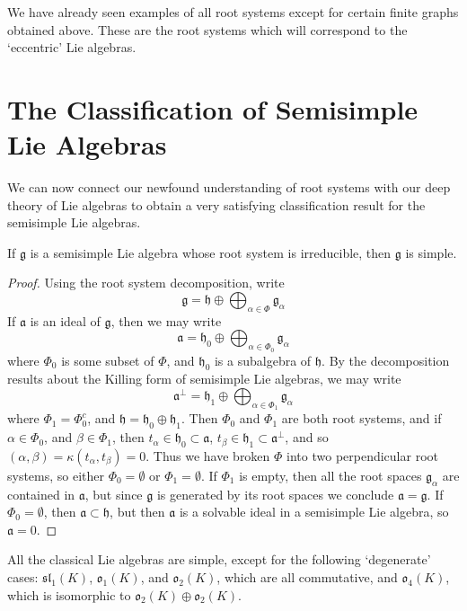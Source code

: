 We have already seen examples of all root systems except for certain finite graphs obtained above. These are the root systems which will correspond to the `eccentric' Lie algebras.

\chapter{The Classification of Semisimple Lie Algebras}

We can now connect our newfound understanding of root systems with our deep theory of Lie algebras to obtain a very satisfying classification result for the semisimple Lie algebras.

\begin{theorem}
    If $\mathfrak{g}$ is a semisimple Lie algebra whose root system is irreducible, then $\mathfrak{g}$ is simple.
\end{theorem}
\begin{proof}
    Using the root system decomposition, write
    \[ \mathfrak{g} = \mathfrak{h} \oplus \bigoplus_{\alpha \in \Phi} \mathfrak{g}_\alpha \]
    If $\mathfrak{a}$ is an ideal of $\mathfrak{g}$, then we may write
    \[ \mathfrak{a} = \mathfrak{h}_0 \oplus \bigoplus_{\alpha \in \Phi_0} \mathfrak{g}_\alpha \]
    where $\Phi_0$ is some subset of $\Phi$, and $\mathfrak{h}_0$ is a subalgebra of $\mathfrak{h}$. By the decomposition results about the Killing form of semisimple Lie algebras, we may write
    \[ \mathfrak{a}^\perp = \mathfrak{h}_1 \oplus \bigoplus_{\alpha \in \Phi_1} \mathfrak{g}_\alpha \]
    where $\Phi_1 = \Phi_0^c$, and $\mathfrak{h} = \mathfrak{h}_0 \oplus \mathfrak{h}_1$. Then $\Phi_0$ and $\Phi_1$ are both root systems, and if $\alpha \in \Phi_0$, and $\beta \in \Phi_1$, then $t_\alpha \in \mathfrak{h}_0 \subset \mathfrak{a}$, $t_\beta \in \mathfrak{h}_1 \subset \mathfrak{a}^\perp$, and so $(\alpha, \beta) = \kappa(t_\alpha, t_\beta) = 0$. Thus we have broken $\Phi$ into two perpendicular root systems, so either $\Phi_0 = \emptyset$ or $\Phi_1 = \emptyset$. If $\Phi_1$ is empty, then all the root spaces $\mathfrak{g}_\alpha$ are contained in $\mathfrak{a}$, but since $\mathfrak{g}$ is generated by its root spaces we conclude $\mathfrak{a} = \mathfrak{g}$. If $\Phi_0 = \emptyset$, then $\mathfrak{a} \subset \mathfrak{h}$, but then $\mathfrak{a}$ is a solvable ideal in a semisimple Lie algebra, so $\mathfrak{a} = 0$.
\end{proof}

\begin{corollary}
    All the classical Lie algebras are simple, except for the following `degenerate' cases: $\mathfrak{sl}_1(K)$, $\mathfrak{o}_1(K)$, and $\mathfrak{o}_2(K)$, which are all commutative, and $\mathfrak{o}_4(K)$, which is isomorphic to $\mathfrak{o}_2(K) \oplus \mathfrak{o}_2(K)$.
\end{corollary}

